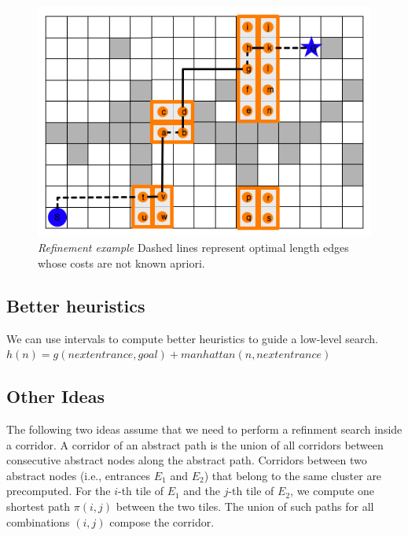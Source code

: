 \begin{figure}[htbp]
	\vspace{-9pt}
	\caption{\emph{Refinement example} Dashed lines represent optimal length edges whose costs are not known apriori.}
       \begin{center}
          \includegraphics[scale=0.35, trim = 20mm 9mm 20mm 0mm]{diagrams/refinementexample.png}
       \end{center}
       \label{ia-fig:refinement}
	\vspace{-6pt}
\end{figure}

\subsection{Better heuristics}
We can use intervals to compute better heuristics to guide a low-level search.
$h(n) = g(nextentrance, goal) + manhattan(n, nextentrance)$

\subsection{Other Ideas}

The following two ideas assume that we need to perform a refinment search
inside a corridor.
A corridor of an abstract path is the union of all corridors between
consecutive abstract nodes along the abstract path.
Corridors between two abstract nodes (i.e., entrances $E_1$ and $E_2$)
that belong to the same cluster are precomputed.
For the $i$-th tile of $E_1$ and the $j$-th tile of $E_2$,
we compute one shortest path $\pi(i,j)$ between the two tiles.
The union of such paths for all combinations $(i,j)$
compose the corridor.

